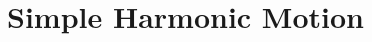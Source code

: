 \documentclass{article}
\begin{document}
\setcounter{section}{17}
\section{Simple Harmonic Motion}






\end{document}
